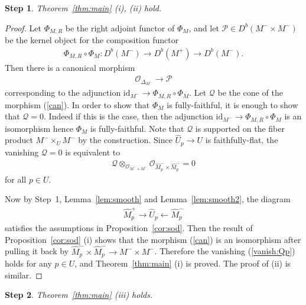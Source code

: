 \documentclass[11pt]{amsart}
\theoremstyle{plain}
\newtheorem{step}{Step}
\newcommand{\oO}{\mathcal{O}}
\newcommand{\pP}{\mathcal{P}}
\newcommand{\qQ}{\mathcal{Q}}
\newcommand{\id}{\textrm{id}}
\begin{document}
\begin{step}
Theorem~\ref{thm:main} (i), (ii) hold. 
\end{step}
\begin{proof}
Let $\Phi_{M, R}$ be the right adjoint functor of $\Phi_M$, 
and let $\pP \in D^b(M^- \times M^-)$ be the kernel 
object for the composition functor
\begin{align*}
\Phi_{M, R} \circ \Phi_M \colon D^b(M^-) \to D^b(M^+) \to D^b(M^-).
\end{align*}
Then there is a canonical morphism 
\begin{align}\label{can}
\oO_{\Delta_{M^-}} \to \pP
\end{align}
corresponding to the 
adjunction $\id_{M^-} \to \Phi_{M, R} \circ \Phi_M$. 
Let $\qQ$ be the cone of the morphism (\ref{can}). 
In order to show that $\Phi_M$ is fully-faithful, 
it is enough to show that $\qQ=0$. 
Indeed if this is the case, then 
the adjunction $\id_{M^-} \to \Phi_{M, R} \circ \Phi_M$
is an isomorphism hence $\Phi_M$ is fully-faithful. 
Note that $\qQ$ is supported on the 
fiber product $M^- \times_U M^-$
by the construction. 
Since $\widehat{U}_p \to U$ is faithfully-flat, 
the vanishing $\qQ=0$ is equivalent to 
\begin{align}\label{vanish:Qp}
\qQ \otimes_{\oO_{M^- \times M^-}} \oO_{\widehat{M}_p^-
\times \widehat{M}_p^-}
=0
\end{align}
for all $p \in U$. 

Now by Step~1,
Lemma~\ref{lem:smooth} and Lemma~\ref{lem:smooth2}, 
the diagram
\begin{align*}
\widehat{M}_p^{+} \to \widehat{U}_p \leftarrow
\widehat{M}_p^{-}
\end{align*}
satisfies the assumptions in Proposition~\ref{cor:sod}. 
Then the result of Proposition~\ref{cor:sod} (i) shows that 
the morphism (\ref{can}) is an isomorphism after 
pulling it back by
$\widehat{M}_p^- \times \widehat{M}_p^- \to 
M^- \times M^-$. 
Therefore the vanishing (\ref{vanish:Qp}) holds
for any $p \in U$,  
and Theorem~\ref{thm:main} (i) is proved.  
The proof of (ii) is similar. 
\end{proof}
\begin{step}
Theorem~\ref{thm:main} (iii) holds. 
\end{step}
\end{document}
